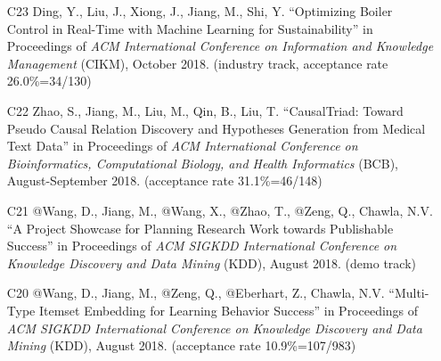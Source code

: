 \documentclass[10pt]{article}
\newenvironment{myindentpar}[1]%
{\begin{list}{}%
         {\setlength{\leftmargin}{#1}}%
         \item[]%
}
{\end{list}}
\newcounter{list}
\begin{document}
\begin{myindentpar}{0.00cm}
\begin{enumerate}[leftmargin=.5cm]
\vspace{-0.1cm}

\item[C23] Ding, Y., Liu, J., Xiong, J., Jiang, M., Shi, Y. ``Optimizing Boiler Control in Real-Time with Machine Learning for Sustainability'' in Proceedings of \emph{ACM International Conference on Information and Knowledge Management} (CIKM), October 2018. (industry track, acceptance rate 26.0\%=34/130)

\vspace{-0.1cm}

\item[C22] Zhao, S., Jiang, M., Liu, M., Qin, B., Liu, T. ``CausalTriad: Toward Pseudo Causal Relation Discovery and Hypotheses Generation from Medical Text Data'' in Proceedings of \emph{ACM International Conference on Bioinformatics, Computational Biology, and Health Informatics} (BCB), August-September 2018. (acceptance rate 31.1\%=46/148)

\vspace{-0.1cm}

\item[C21] @Wang, D., Jiang, M., @Wang, X., @Zhao, T., @Zeng, Q., Chawla, N.V. ``A Project Showcase for Planning Research Work towards Publishable Success'' in Proceedings of \emph{ACM SIGKDD International Conference on Knowledge Discovery and Data Mining} (KDD), August 2018. (demo track)

\vspace{-0.1cm}

\item[C20] @Wang, D., Jiang, M., @Zeng, Q., @Eberhart, Z., Chawla, N.V. ``Multi-Type Itemset Embedding for Learning Behavior Success'' in Proceedings of \emph{ACM SIGKDD International Conference on Knowledge Discovery and Data Mining} (KDD), August 2018. (acceptance rate 10.9\%=107/983)


\end{enumerate}
\end{myindentpar}
\end{document}
